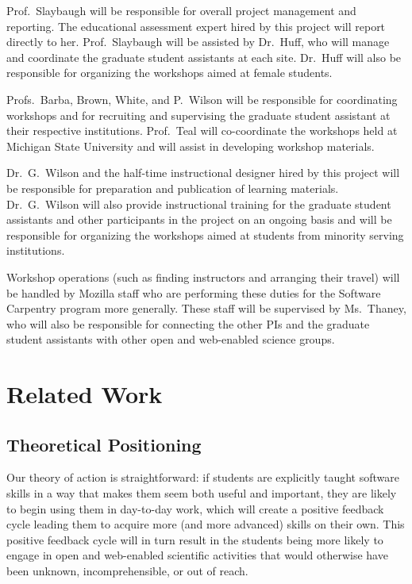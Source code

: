 \documentclass{proposalnsf}
\newlength{\up}
\begin{document}
Prof.\ Slaybaugh will be responsible for overall project management
and reporting.  The educational assessment expert hired by this
project will report directly to her.  Prof.\ Slaybaugh will be
assisted by Dr.\ Huff, who will manage and coordinate the graduate
student assistants at each site.  Dr.\ Huff will also be responsible
for organizing the workshops aimed at female students.

Profs.\ Barba, Brown, White, and P.\ Wilson will be responsible for
coordinating workshops and for recruiting and supervising the graduate
student assistant at their respective institutions. Prof.\ Teal will co-coordinate the workshops held at Michigan State University and will assist in developing workshop materials.

Dr.\ G.\ Wilson and the half-time instructional designer hired by this
project will be responsible for preparation and publication of
learning materials.  Dr.\ G.\ Wilson will also provide instructional
training for the graduate student assistants and other participants in
the project on an ongoing basis and will be responsible for
organizing the workshops aimed at students from minority serving institutions.

Workshop operations (such as finding instructors and arranging their
travel) will be handled by Mozilla staff who are performing these
duties for the Software Carpentry program more generally.  These staff
will be supervised by Ms.\ Thaney, who will also be responsible for
connecting the other PIs and the graduate student assistants with
other open and web-enabled science groups.

\section{Related Work}

\subsection{Theoretical Positioning}

Our theory of action is straightforward: if students are explicitly
taught software skills in a way that makes them seem both useful and
important, they are likely to begin using them in day-to-day work,
which will create a positive feedback cycle leading them to acquire
more (and more advanced) skills on their own. This positive feedback
cycle will in turn result in the students being more likely to engage
in open and web-enabled scientific activities that would otherwise
have been unknown, incomprehensible, or out of reach.
\end{document}
